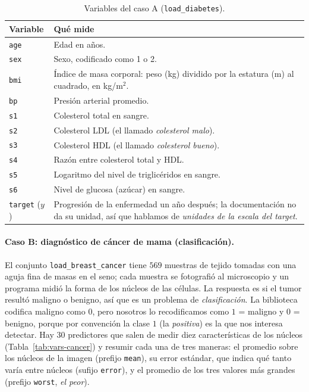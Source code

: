 \begin{table}[H]
\centering
\small
\begin{tabular}{l>{\raggedright\arraybackslash}p{11.5cm}}
\toprule
Variable & Qué mide \\
\midrule
\texttt{age} & Edad en años. \\
\texttt{sex} & Sexo, codificado como 1 o 2. \\
\texttt{bmi} & Índice de masa corporal: peso (kg) dividido por la estatura
(m) al cuadrado, en kg/m$^2$. \\
\texttt{bp} & Presión arterial promedio. \\
\texttt{s1} & Colesterol total en sangre. \\
\texttt{s2} & Colesterol LDL (el llamado \emph{colesterol malo}). \\
\texttt{s3} & Colesterol HDL (el llamado \emph{colesterol bueno}). \\
\texttt{s4} & Razón entre colesterol total y HDL. \\
\texttt{s5} & Logaritmo del nivel de triglicéridos en sangre. \\
\texttt{s6} & Nivel de glucosa (azúcar) en sangre. \\
\texttt{target} ($y$) & Progresión de la enfermedad un año después; la
documentación no da su unidad, así que hablamos de \emph{unidades de la
escala del target}. \\
\bottomrule
\end{tabular}
\caption{Variables del caso A (\texttt{load\_diabetes}).}
\label{tab:vars-diabetes}
\end{table}

\paragraph{Caso B: diagnóstico de cáncer de mama (clasificación).}
El conjunto \texttt{load\_breast\_cancer} tiene $569$ muestras de tejido
tomadas con una aguja fina de masas en el seno; cada muestra se fotografió
al microscopio y un programa midió la forma de los núcleos de las células.
La respuesta es si el tumor resultó maligno o benigno, así que es un
problema de \emph{clasificación}. La biblioteca codifica maligno como 0,
pero nosotros lo recodificamos como $1$ = maligno y $0$ = benigno, porque
por convención la clase $1$ (la \emph{positiva}) es la que nos interesa
detectar. Hay $30$ predictores que salen de medir diez características de
los núcleos (Tabla~\ref{tab:vars-cancer}) y resumir cada una de tres
maneras: el promedio sobre los núcleos de la imagen (prefijo
\texttt{mean}), su error estándar, que indica qué tanto varía entre núcleos
(sufijo \texttt{error}), y el promedio de los tres valores más grandes
(prefijo \texttt{worst}, \emph{el peor}).

